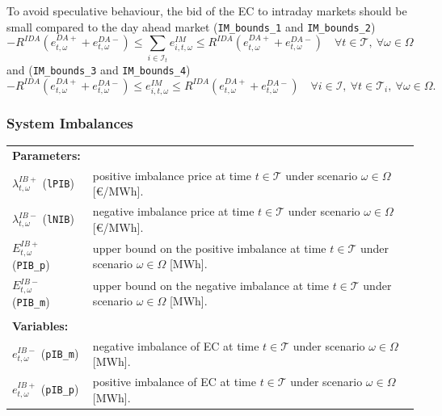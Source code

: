 To avoid speculative behaviour, the bid of the EC to intraday markets should be small compared to the day ahead market (\verb|IM_bounds_1| and \verb|IM_bounds_2|)
\begin{equation} \label{EQ:DM_IM_1}
	-R^{IDA} (e^{DA+}_{t, \omega} + e^{DA-}_{t, \omega})  \leq \sum_{i \in \mathcal{I}_t} e^{IM}_{i, t, \omega} \leq R^{IDA} (e^{DA+}_{t, \omega} + e^{DA-}_{t, \omega}) \quad \forall t \in \mathcal{T}, \ \forall \omega \in \Omega
\end{equation}
and (\verb|IM_bounds_3| and \verb|IM_bounds_4|)
\begin{equation} \label{EQ:IM_bounds_3-4}
	-R^{IDA} (e^{DA+}_{t, \omega} + e^{DA-}_{t, \omega}) \leq e^{IM}_{i, t, \omega} \leq R^{IDA} (e^{DA+}_{t, \omega} + e^{DA-}_{t, \omega}) \quad \forall i \in \mathcal{I}, \ \forall t \in \mathcal{T}_i, \ \forall \omega \in \Omega.
\end{equation}


\subsubsection{System Imbalances}

\begin{tabularx}{\textwidth}{l X}
\textbf{Parameters:} \\
$\lambda^{IB+}_{t, \omega}$ (\texttt{lPIB}) & positive imbalance price at time $t \in \mathcal{T}$ under scenario $\omega \in \Omega$ [\euro/MWh]. \\
$\lambda^{IB-}_{t, \omega}$ (\texttt{lNIB}) & negative imbalance price at time $t \in \mathcal{T}$ under scenario $\omega \in \Omega$ [\euro/MWh]. \\
$E^{IB+}_{t, \omega}$ (\texttt{PIB\_p}) & upper bound on the positive imbalance at time $t \in \mathcal{T}$ under scenario $\omega \in \Omega$ [MWh]. \\
$E^{IB-}_{t, \omega}$ (\texttt{PIB\_m}) & upper bound on the negative imbalance at time $t \in \mathcal{T}$ under scenario $\omega \in \Omega$ [MWh]. \\
\\

\textbf{Variables:} \\
$e^{IB-}_{t, \omega}$ (\texttt{pIB\_m}) & negative imbalance of EC at time $t \in \mathcal{T}$ under scenario $\omega \in \Omega$ [MWh]. \\
$e^{IB+}_{t, \omega}$ (\texttt{pIB\_p}) & positive imbalance of EC at time $t \in \mathcal{T}$ under scenario $\omega \in \Omega$ [MWh]. \\
\end{tabularx}

